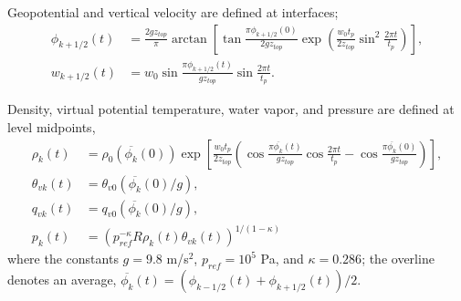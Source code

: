 Geopotential and vertical velocity are defined at interfaces;
\begin{align}
  \phi_{k+1/2}(t) &= \frac{2gz_{top}}{\pi}\arctan\left[\tan\frac{\pi \phi_{k+1/2}(0)}{2g z_{top}}\exp\left(\frac{w_0t_p}{2z_{top}} \sin^2 \frac{2\pi t}{t_p}\right)\right], \label{eq:phi_disc}\\
  w_{k+1/2}(t) &= w_0 \sin \frac{\pi \phi_{k+1/2}(t)}{g z_{top}}\sin\frac{2\pi t}{t_p}. \label{eq:w_disc}
\end{align}

Density, virtual potential temperature, water vapor, and pressure are defined at level midpoints,
\begin{align}
  \rho_k(t) &= \rho_0(\overline{\phi_k}(0))\exp\left[\frac{ w_0 t_p}{2z_{top}}\left(\cos\frac{\pi \overline{\phi_k}(t)}{gz_{top}}\cos\frac{2\pi t}{t_p}-\cos\frac{\pi \overline{\phi_{k}}(0)}{gz_{top}}\right)\right], \label{eq:rho_disc}\\
  \theta_{vk}(t) &= \theta_{v0}(\overline{\phi_k}(0)/g), \label{eq:thetav_disc} \\
  q_{vk}(t) &= q_{v0}(\overline{\phi_k}(0)/g), \label{eq:qv_disc} \\
p_k(t) &=  \left(p_{ref}^{-\kappa} R \rho_k(t)\theta_{vk}(t)\right)^{1/(1-\kappa)}\label{eq:p_disc}
\end{align}
where the constants $g = 9.8$ m/s$^2$, $p_{ref} = 10^5$ Pa, and $\kappa = 0.286$; the overline denotes an average, $\overline{\phi_k}(t) = (\phi_{k-1/2}(t) + \phi_{k+1/2}(t))/2$.



